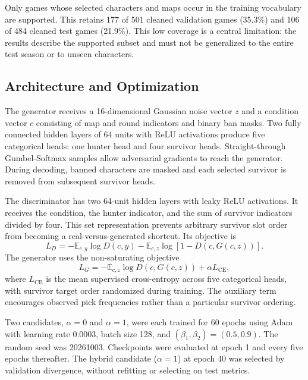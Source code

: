 Only games whose selected characters and maps occur in the training vocabulary
are supported. This retains 177 of 501 cleaned validation games (35.3\%) and
106 of 484 cleaned test games (21.9\%). This low coverage is a central
limitation: the results describe the supported subset and must not be
generalized to the entire test season or to unseen characters.

\subsection{Architecture and Optimization}
The generator receives a 16-dimensional Gaussian noise vector $z$ and a
condition vector $c$ consisting of map and round indicators and binary ban
masks. Two fully connected hidden layers of 64 units with ReLU activations
produce five categorical heads: one hunter head and four survivor heads.
Straight-through Gumbel-Softmax samples allow adversarial gradients to reach
the generator. During decoding, banned characters are masked and each selected
survivor is removed from subsequent survivor heads.

The discriminator has two 64-unit hidden layers with leaky ReLU activations.
It receives the condition, the hunter indicator, and the sum of survivor
indicators divided by four. This set representation prevents arbitrary
survivor slot order from becoming a real-versus-generated shortcut.
Its objective is
\begin{equation}
L_D=-\mathbb{E}_{c,y}\log D(c,y)
    -\mathbb{E}_{c,z}\log[1-D(c,G(c,z))].
\end{equation}
The generator uses the non-saturating objective
\begin{equation}
L_G=-\mathbb{E}_{c,z}\log D(c,G(c,z))
    +\alpha L_{\mathrm{CE}},
\end{equation}
where $L_{\mathrm{CE}}$ is the mean supervised cross-entropy across five
categorical heads, with survivor target order randomized during training.
The auxiliary term encourages observed pick frequencies rather than a
particular survivor ordering.

Two candidates, $\alpha=0$ and $\alpha=1$, were each trained for 60 epochs
using Adam with learning rate 0.0003, batch size 128, and
$(\beta_1,\beta_2)=(0.5,0.9)$. The random seed was 20261003.
Checkpoints were evaluated at epoch 1 and every five epochs thereafter.
The hybrid candidate ($\alpha=1$) at epoch 40 was selected by validation
divergence, without refitting or selecting on test metrics.

